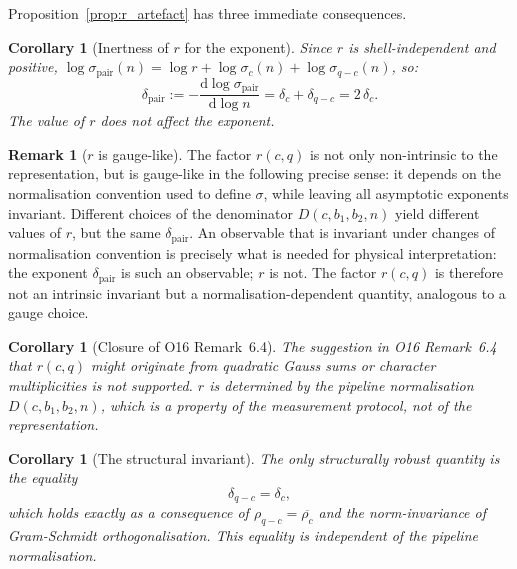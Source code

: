 \documentclass[11pt,a4paper]{article}
\newtheorem{corollary}[theorem]{Corollary}
\theoremstyle{definition}
\newtheorem{remark}[theorem]{Remark}
\begin{document}
      Proposition~\ref{prop:r_artefact} has three immediate consequences.

      \begin{corollary}[Inertness of $r$ for the exponent]
        \label{cor:r_inert}
        Since $r$ is shell-independent and positive,
        $\log\sigma_{\mathrm{pair}}(n) = \log r + \log\sigma_c(n) + \log\sigma_{q-c}(n)$,
        so:
        \[
          \delta_{\mathrm{pair}}
          := -\frac{\mathrm{d}\log\sigma_{\mathrm{pair}}}{\mathrm{d}\log n}
          = \delta_c + \delta_{q-c} = 2\,\delta_c.
        \]
        The value of $r$ does not affect the exponent.
      \end{corollary}

      \begin{remark}[$r$ is gauge-like]
        \label{rem:r_gauge}
        The factor $r(c,q)$ is not only non-intrinsic to the representation,
        but is gauge-like in the following precise sense:
        it depends on the normalisation convention used to define $\sigma$,
        while leaving all asymptotic exponents invariant.
        Different choices of the denominator $D(c,b_1,b_2,n)$ yield
        different values of $r$, but the same $\delta_{\mathrm{pair}}$.
        An observable that is invariant under changes of normalisation
        convention is precisely what is needed for physical interpretation:
        the exponent $\delta_{\mathrm{pair}}$ is such an observable; $r$ is not.
        The factor $r(c,q)$ is therefore not an intrinsic invariant but a
        normalisation-dependent quantity, analogous to a gauge choice.
      \end{remark}

      \begin{corollary}[Closure of O16 Remark~6.4]
        \label{cor:remark_closure}
        The suggestion in O16 Remark~6.4 that $r(c,q)$ might originate
        from quadratic Gauss sums or character multiplicities is not
        supported.
        $r$ is determined by the pipeline normalisation~$D(c, b_1, b_2, n)$,
        which is a property of the measurement protocol, not of the
        representation.
      \end{corollary}

      \begin{corollary}[The structural invariant]
        \label{cor:invariant}
        The only structurally robust quantity is the equality
        \[
          \delta_{q-c} = \delta_c,
        \]
        which holds exactly as a consequence of $\rho_{q-c} = \overline{\rho_c}$
        and the norm-invariance of Gram-Schmidt orthogonalisation.
        This equality is independent of the pipeline normalisation.
      \end{corollary}
\end{document}
